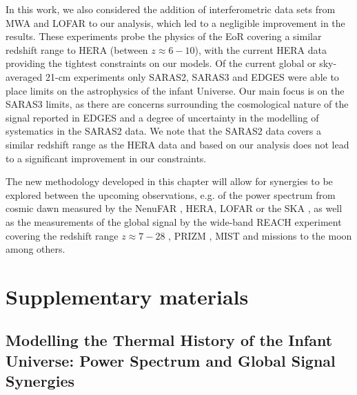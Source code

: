 In this work, we also considered the addition of interferometric data sets from  MWA and LOFAR to our analysis, which led to a negligible improvement in the results. These experiments probe the physics of the EoR covering a similar redshift range to HERA (between $z\approx 6 - 10$), with the current HERA data providing the tightest constraints on our models. Of the current global or sky-averaged 21-cm experiments only SARAS2, SARAS3 and EDGES were able to place limits on the astrophysics of the infant Universe. Our main focus is on the SARAS3 limits, as there are concerns surrounding the cosmological nature of the signal reported in EDGES and a degree of uncertainty in the modelling of systematics in the SARAS2 data. We note that the SARAS2 data covers a similar redshift range as the HERA data and based on our analysis does not lead to a significant improvement in our constraints.

The new methodology developed in this chapter will allow for synergies to be explored between the upcoming observations, e.g. of the power spectrum from cosmic dawn measured by the NenuFAR \cite{Zarka_nenuFar_2018}, HERA, LOFAR or the SKA \cite{Mellema_SKA_2013}, as well as the measurements of the global signal by the wide-band REACH experiment covering the redshift range $z\approx 7 - 28$ \cite{de_lera_acedo_reach_2022},  PRIZM \cite{Philip_PRIZM_2019}, MIST \cite{MIST} and missions to the moon \cite{Burns_Moon_2021} among others. 

\renewcommand\thefigure{\arabic{chapter}.S.\arabic{figure}}
\renewcommand\thetable{\arabic{chapter}.S.\arabic{table}}
\renewcommand\thesubsection{\arabic{chapter}.S.\arabic{subsection}}
\renewcommand\thesection{\arabic{chapter}.S}

\setcounter{figure}{0}
\setcounter{table}{0}

\section{Supplementary materials} \label{sec:suplimentary_joint}

\subsection{Modelling the Thermal History of the Infant Universe: Power Spectrum and Global Signal Synergies}
\label{sec:modelling_joint}

